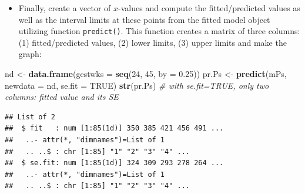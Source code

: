 \documentclass[
]{book}
\newenvironment{Shaded}{\begin{snugshade}}{\end{snugshade}}
\newcommand{\AttributeTok}[1]{\textcolor[rgb]{0.13,0.29,0.53}{#1}}
\newcommand{\CommentTok}[1]{\textcolor[rgb]{0.56,0.35,0.01}{\textit{#1}}}
\newcommand{\ConstantTok}[1]{\textcolor[rgb]{0.56,0.35,0.01}{#1}}
\newcommand{\DecValTok}[1]{\textcolor[rgb]{0.00,0.00,0.81}{#1}}
\newcommand{\FloatTok}[1]{\textcolor[rgb]{0.00,0.00,0.81}{#1}}
\newcommand{\FunctionTok}[1]{\textcolor[rgb]{0.13,0.29,0.53}{\textbf{#1}}}
\newcommand{\NormalTok}[1]{#1}
\newcommand{\OtherTok}[1]{\textcolor[rgb]{0.56,0.35,0.01}{#1}}
\providecommand{\tightlist}{%
  \setlength{\itemsep}{0pt}\setlength{\parskip}{0pt}}
\begin{document}
\begin{itemize}
\tightlist
\item
  Finally, create a vector of \(x\)-values and compute
  the fitted/predicted values as well
  as the interval limits at these points from the fitted
  model object utilizing
  function \texttt{predict()}.
  This function creates a matrix of three columns: (1) fitted/predicted
  values, (2) lower limits, (3) upper limits and
  make the graph:
\end{itemize}

\begin{Shaded}
\begin{Highlighting}[]
\NormalTok{nd }\OtherTok{\textless{}{-}} \FunctionTok{data.frame}\NormalTok{(}\AttributeTok{gestwks =} \FunctionTok{seq}\NormalTok{(}\DecValTok{24}\NormalTok{, }\DecValTok{45}\NormalTok{, }\AttributeTok{by =} \FloatTok{0.25}\NormalTok{))}
\NormalTok{pr.Ps }\OtherTok{\textless{}{-}} \FunctionTok{predict}\NormalTok{(mPs, }\AttributeTok{newdata =}\NormalTok{ nd, }\AttributeTok{se.fit =} \ConstantTok{TRUE}\NormalTok{)}
\FunctionTok{str}\NormalTok{(pr.Ps) }\CommentTok{\# with se.fit=TRUE, only two columns: fitted value and its SE}
\end{Highlighting}
\end{Shaded}

\begin{verbatim}
## List of 2
##  $ fit   : num [1:85(1d)] 350 385 421 456 491 ...
##   ..- attr(*, "dimnames")=List of 1
##   .. ..$ : chr [1:85] "1" "2" "3" "4" ...
##  $ se.fit: num [1:85(1d)] 324 309 293 278 264 ...
##   ..- attr(*, "dimnames")=List of 1
##   .. ..$ : chr [1:85] "1" "2" "3" "4" ...
\end{verbatim}
\end{document}
